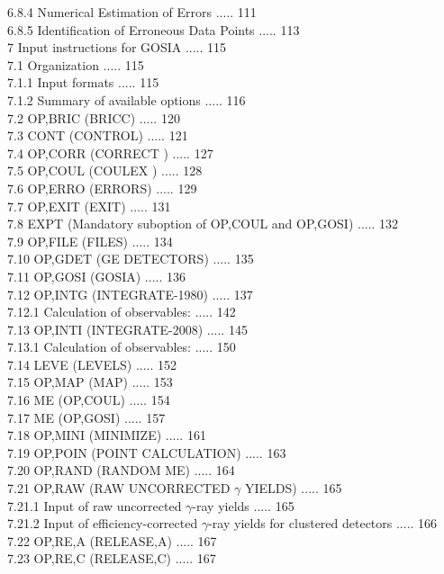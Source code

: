 \documentclass[10pt]{article}
\begin{document}
6.8.4 Numerical Estimation of Errors ..... 111\\
6.8.5 Identification of Erroneous Data Points ..... 113\\
7 Input instructions for GOSIA ..... 115\\
7.1 Organization ..... 115\\
7.1.1 Input formats ..... 115\\
7.1.2 Summary of available options ..... 116\\
7.2 OP,BRIC (BRICC) ..... 120\\
7.3 CONT (CONTROL) ..... 121\\
7.4 OP,CORR (CORRECT ) ..... 127\\
7.5 OP,COUL (COULEX ) ..... 128\\
7.6 OP,ERRO (ERRORS) ..... 129\\
7.7 OP,EXIT (EXIT) ..... 131\\
7.8 EXPT (Mandatory suboption of OP,COUL and OP,GOSI) ..... 132\\
7.9 OP,FILE (FILES) ..... 134\\
7.10 OP,GDET (GE DETECTORS) ..... 135\\
7.11 OP,GOSI (GOSIA) ..... 136\\
7.12 OP,INTG (INTEGRATE-1980) ..... 137\\
7.12.1 Calculation of observables: ..... 142\\
7.13 OP,INTI (INTEGRATE-2008) ..... 145\\
7.13.1 Calculation of observables: ..... 150\\
7.14 LEVE (LEVELS) ..... 152\\
7.15 OP,MAP (MAP) ..... 153\\
7.16 ME (OP,COUL) ..... 154\\
7.17 ME (OP,GOSI) ..... 157\\
7.18 OP,MINI (MINIMIZE) ..... 161\\
7.19 OP,POIN (POINT CALCULATION) ..... 163\\
7.20 OP,RAND (RANDOM ME) ..... 164\\
7.21 OP,RAW (RAW UNCORRECTED $\gamma$ YIELDS) ..... 165\\
7.21.1 Input of raw uncorrected $\gamma$-ray yields ..... 165\\
7.21.2 Input of efficiency-corrected $\gamma$-ray yields for clustered detectors ..... 166\\
7.22 OP,RE,A (RELEASE,A) ..... 167\\
7.23 OP,RE,C (RELEASE,C) ..... 167\\
\end{document}
